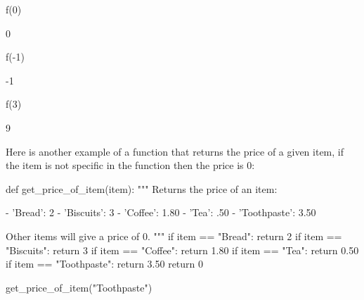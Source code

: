 \begin{pyin}
f(0)
\end{pyin}





\begin{raw}
0
\end{raw}







\begin{pyin}
f(-1)
\end{pyin}





\begin{raw}
-1
\end{raw}







\begin{pyin}
f(3)
\end{pyin}





\begin{raw}
9
\end{raw}





Here is another example of a function that returns the price of a given item, if
the item is not specific in the function then the price is 0:




\begin{pyin}
def get_price_of_item(item):
    """
    Returns the price of an item:

    - 'Bread': 2
    - 'Biscuits': 3
    - 'Coffee': 1.80
    - 'Tea': .50
    - 'Toothpaste': 3.50

    Other items will give a price of 0.
    """
    if item == "Bread":
        return 2
    if item == "Biscuits":
        return 3
    if item == "Coffee":
        return 1.80
    if item == "Tea":
        return 0.50
    if item == "Toothpaste":
        return 3.50
    return 0
\end{pyin}







\begin{pyin}
get_price_of_item("Toothpaste")
\end{pyin}





